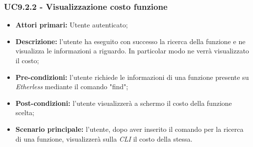 \subsubsection{UC9.2.2 - Visualizzazione costo funzione}
\begin{itemize}
	\item \textbf{Attori primari:} Utente autenticato;
	\item \textbf{Descrizione:} l'utente ha eseguito con successo la ricerca della funzione e ne visualizza le informazioni a riguardo. In particolar modo ne verrà visualizzato il costo; 
	\item \textbf{Pre-condizioni:} l'utente richiede le informazioni di una funzione presente su \textit{Etherless} mediante il comando "find"; 
	\item \textbf{Post-condizioni:} l'utente visualizzerà a schermo il costo della funzione scelta;
	\item \textbf{Scenario principale:} l'utente, dopo aver inserito il comando per la ricerca di una funzione, visualizzerà sulla \textit{CLI\glo} il costo della stessa.
\end{itemize}